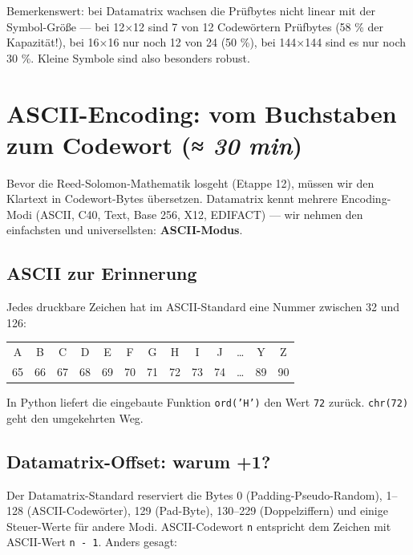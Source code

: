 Bemerkenswert: bei Datamatrix wachsen die Prüfbytes nicht linear mit
der Symbol-Größe — bei 12$\times$12 sind 7 von 12 Codewörtern Prüfbytes
(58 \% der Kapazität!), bei 16$\times$16 nur noch 12 von 24 (50 \%),
bei 144$\times$144 sind es nur noch 30 \%. Kleine Symbole sind also
besonders robust.

\section{ASCII-Encoding: vom Buchstaben zum Codewort \normalfont(\textit{≈ 30 min})}

Bevor die Reed-Solomon-Mathematik losgeht (Etappe 12), müssen wir
den Klartext in Codewort-Bytes übersetzen. Datamatrix kennt mehrere
Encoding-Modi (ASCII, C40, Text, Base 256, X12, EDIFACT) — wir nehmen
den einfachsten und universellsten: \textbf{ASCII-Modus}.

\subsection*{ASCII zur Erinnerung}

Jedes druckbare Zeichen hat im ASCII-Standard eine Nummer zwischen 32
und 126:

\begin{center}
\small\ttfamily
\begin{tabular}{c|c|c|c|c|c|c|c|c|c|c|c|c}
\toprule
A & B & C & D & E & F & G & H & I & J & \dots & Y & Z \\
65 & 66 & 67 & 68 & 69 & 70 & 71 & 72 & 73 & 74 & \dots & 89 & 90 \\
\bottomrule
\end{tabular}
\end{center}

In Python liefert die eingebaute Funktion \texttt{ord('H')} den Wert
\texttt{72} zurück. \texttt{chr(72)} geht den umgekehrten Weg.

\subsection*{Datamatrix-Offset: warum +1?}

Der Datamatrix-Standard reserviert die Bytes 0 (Padding-Pseudo-Random),
1--128 (ASCII-Codewörter), 129 (Pad-Byte), 130--229 (Doppelziffern)
und einige Steuer-Werte für andere Modi. ASCII-Codewort \texttt{n}
entspricht dem Zeichen mit ASCII-Wert \texttt{n - 1}. Anders gesagt:

